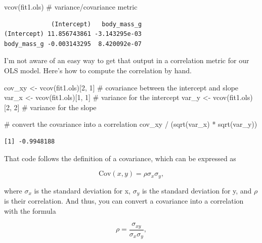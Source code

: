 \documentclass[
  letterpaper,
  DIV=11,
  numbers=noendperiod]{scrartcl}
\newenvironment{Shaded}{\begin{snugshade}}{\end{snugshade}}
\newcommand{\CommentTok}[1]{\textcolor[rgb]{0.37,0.37,0.37}{#1}}
\newcommand{\DecValTok}[1]{\textcolor[rgb]{0.68,0.00,0.00}{#1}}
\newcommand{\FunctionTok}[1]{\textcolor[rgb]{0.28,0.35,0.67}{#1}}
\newcommand{\NormalTok}[1]{\textcolor[rgb]{0.00,0.23,0.31}{#1}}
\newcommand{\OtherTok}[1]{\textcolor[rgb]{0.00,0.23,0.31}{#1}}
\newcommand{\SpecialCharTok}[1]{\textcolor[rgb]{0.37,0.37,0.37}{#1}}
\begin{document}
\begin{Shaded}
\begin{Highlighting}[]
\FunctionTok{vcov}\NormalTok{(fit1.ols)  }\CommentTok{\# variance/covariance metric}
\end{Highlighting}
\end{Shaded}

\begin{verbatim}
             (Intercept)   body_mass_g
(Intercept) 11.856743861 -3.143295e-03
body_mass_g -0.003143295  8.420092e-07
\end{verbatim}

I'm not aware of an easy way to get that output in a correlation metric
for our OLS model. Here's how to compute the correlation by hand.

\begin{Shaded}
\begin{Highlighting}[]
\NormalTok{cov\_xy }\OtherTok{\textless{}{-}} \FunctionTok{vcov}\NormalTok{(fit1.ols)[}\DecValTok{2}\NormalTok{, }\DecValTok{1}\NormalTok{]  }\CommentTok{\# covariance between the intercept and slope}
\NormalTok{var\_x  }\OtherTok{\textless{}{-}} \FunctionTok{vcov}\NormalTok{(fit1.ols)[}\DecValTok{1}\NormalTok{, }\DecValTok{1}\NormalTok{]  }\CommentTok{\# variance for the intercept}
\NormalTok{var\_y  }\OtherTok{\textless{}{-}} \FunctionTok{vcov}\NormalTok{(fit1.ols)[}\DecValTok{2}\NormalTok{, }\DecValTok{2}\NormalTok{]  }\CommentTok{\# variance for the slope}

\CommentTok{\# convert the covariance into a correlation}
\NormalTok{cov\_xy }\SpecialCharTok{/}\NormalTok{ (}\FunctionTok{sqrt}\NormalTok{(var\_x) }\SpecialCharTok{*} \FunctionTok{sqrt}\NormalTok{(var\_y))}
\end{Highlighting}
\end{Shaded}

\begin{verbatim}
[1] -0.9948188
\end{verbatim}

That code follows the definition of a covariance, which can be expressed
as

\[
\text{Cov}(x, y) = \rho \sigma_x \sigma_y,
\]

where \(\sigma_x\) is the standard deviation for x, \(\sigma_y\) is the
standard deviation for y, and \(\rho\) is their correlation. And thus,
you can convert a covariance into a correlation with the formula

\[
\rho = \frac{\sigma_{xy}}{\sigma_x \sigma_y},
\]
\end{document}
